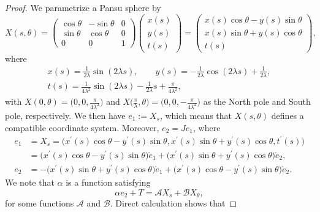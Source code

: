 \documentclass[pdftex]{sigma}
\numberwithin{equation}{section}
\begin{document}
\begin{proof}
We parametrize a Pansu sphere by
\begin{equation} \label{paps}
X(s,\theta)= \left(
\begin{matrix}
\cos \theta & -\sin \theta & 0 \\
\sin \theta & \cos \theta & 0 \\
0 & 0 & 1
\end{matrix}
\right)\left(
\begin{matrix}
x(s) \\
y(s) \\
t(s)
\end{matrix}
\right)=\left(
\begin{matrix}
x(s)\cos \theta-y(s)\sin \theta \\
x(s)\sin \theta+y(s)\cos \theta \\
t(s)
\end{matrix}
\right),
\end{equation}
where
\begin{gather}
x(s) = \frac{1}{2\lambda}\sin(2\lambda s),\qquad
y(s) = -\frac{1}{2\lambda}\cos(2\lambda s)+ \frac{1}{2\lambda},\nonumber\\
t(s) = \frac{1}{4\lambda^2}\sin(2\lambda s)- \frac{1}{2\lambda}s+\frac{
\pi}{4\lambda^2}, \label{ad}
\end{gather}
with $X(0,\theta)=\bigl(0,0,\frac{\pi}{4\lambda^2}\bigr)$ and $X\bigl(\frac{\pi}{\lambda},\theta\bigr)=\bigl(0,0,-\frac{\pi}{4\lambda^2}\bigr)$ as the North pole and South pole, respectively.
We then have $e_1:=X_s$, which means that $X(s,\theta)$
defines a compatible coordinate system. Moreover, $e_2=Je_1$, where
\begin{align*}
e_1&=X_s=\bigl(x^{\prime }(s)\cos \theta-y^{\prime }(s)\sin \theta,x^{\prime
}(s)\sin \theta+y^{\prime }(s)\cos \theta,t^{\prime }(s)\bigr) \\
&=\bigl(x^{\prime }(s)\cos \theta-y^{\prime }(s)\sin \theta\bigr) \mathring
e_1+\bigl(x^{\prime }(s)\sin \theta+y^{\prime }(s)\cos \theta\bigr)\mathring
e_2, \\
e_2&=-\bigl(x^{\prime }(s)\sin \theta+y^{\prime }(s)\cos \theta\bigr)\mathring
e_1+\bigl(x^{\prime }(s)\cos \theta-y^{\prime }(s)\sin \theta\bigr) \mathring e_2.
\end{align*}
We note that $\alpha$ is a function satisfying
\begin{equation} \label{aa}
\alpha e_2+T=\mathcal{A}X_s+\mathcal{B}X_\theta,
\end{equation}
for some functions $\mathcal{A}$ and $\mathcal{B}$. Direct calculation shows that

\end{proof}
\end{document}
